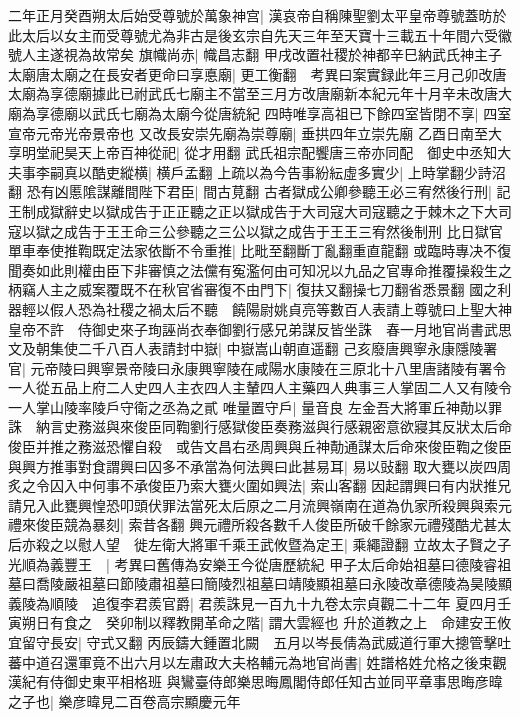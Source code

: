 二年正月癸酉朔太后始受尊號於萬象神宫|{
	漢哀帝自稱陳聖劉太平皇帝尊號蓋昉於此太后以女主而受尊號尤為非古是後玄宗自先天三年至天寶十三載五十年間六受徽號人主遂視為故常矣}
旗幟尚赤|{
	幟昌志翻}
甲戌改置社稷於神都辛巳納武氏神主子太廟唐太廟之在長安者更命曰享悳廟|{
	更工衡翻　考異曰案實録此年三月己卯改唐太廟為享德廟據此已祔武氏七廟主不當至三月方改唐廟新本紀元年十月辛未改唐大廟為享德廟以武氏七廟為太廟今從唐統紀}
四時唯享高祖已下餘四室皆閉不享|{
	四室宣帝元帝光帝景帝也}
又改長安崇先廟為崇尊廟|{
	垂拱四年立崇先廟}
乙酉日南至大享明堂祀昊天上帝百神從祀|{
	從才用翻}
武氏祖宗配饗唐三帝亦同配　御史中丞知大夫事李嗣真以酷吏縱横|{
	横戶孟翻}
上疏以為今告事紛紜虛多實少|{
	上時掌翻少詩沼翻}
恐有凶慝隂謀離間陛下君臣|{
	間古莧翻}
古者獄成公卿參聽王必三宥然後行刑|{
	記王制成獄辭史以獄成告于正正聽之正以獄成告于大司寇大司寇聽之于棘木之下大司寇以獄之成告于王王命三公參聽之三公以獄之成告于王王三宥然後制刑}
比日獄官單車奉使推鞫既定法家依斷不令重推|{
	比毗至翻斷丁亂翻重直龍翻}
或臨時專决不復聞奏如此則權由臣下非審慎之法儻有寃濫何由可知况以九品之官專命推覆操殺生之柄竊人主之威案覆既不在秋官省審復不由門下|{
	復扶又翻操七刀翻省悉景翻}
國之利器輕以假人恐為社稷之禍太后不聽　饒陽尉姚貞亮等數百人表請上尊號曰上聖大神皇帝不許　侍御史來子珣誣尚衣奉御劉行感兄弟謀反皆坐誅　春一月地官尚書武思文及朝集使二千八百人表請封中嶽|{
	中嶽嵩山朝直遥翻}
己亥廢唐興寧永康隱陵署官|{
	元帝陵曰興寧景帝陵曰永康興寧陵在咸陽水康陵在三原北十八里唐諸陵有署令一人從五品上府二人史四人主衣四人主輦四人主藥四人典事三人掌固二人又有陵令一人掌山陵率陵戶守衛之丞為之貳}
唯量置守戶|{
	量音良}
左金吾大將軍丘神勣以罪誅　納言史務滋與來俊臣同鞫劉行感獄俊臣奏務滋與行感親密意欲寢其反狀太后命俊臣并推之務滋恐懼自殺　或告文昌右丞周興與丘神勣通謀太后命來俊臣鞫之俊臣與興方推事對食謂興曰囚多不承當為何法興曰此甚易耳|{
	易以䜴翻}
取大甕以炭四周炙之令囚入中何事不承俊臣乃索大甕火圍如興法|{
	索山客翻}
因起謂興曰有内狀推兄請兄入此甕興惶恐叩頭伏罪法當死太后原之二月流興嶺南在道為仇家所殺興與索元禮來俊臣競為暴刻|{
	索昔各翻}
興元禮所殺各數千人俊臣所破千餘家元禮殘酷尤甚太后亦殺之以慰人望　徙左衛大將軍千乘王武攸暨為定王|{
	乘繩證翻}
立故太子賢之子光順為義豐王　|{
	考異曰舊傳為安樂王今從唐歷統紀}
甲子太后命始祖墓曰德陵睿祖墓曰喬陵嚴祖墓曰節陵肅祖墓曰簡陵烈祖墓曰靖陵顯祖墓曰永陵改章德陵為昊陵顯義陵為順陵　追復李君羨官爵|{
	君羨誅見一百九十九卷太宗貞觀二十二年}
夏四月壬寅朔日有食之　癸卯制以釋教開革命之階|{
	謂大雲經也}
升於道教之上　命建安王攸宜留守長安|{
	守式又翻}
丙辰鑄大鍾置北闕　五月以岑長倩為武威道行軍大摠管擊吐蕃中道召還軍竟不出六月以左肅政大夫格輔元為地官尚書|{
	姓譜格姓允格之後束觀漢紀有侍御史東平相格班}
與鸞臺侍郎樂思晦鳳閣侍郎任知古並同平章事思晦彦暐之子也|{
	樂彦暐見二百卷高宗顯慶元年}
